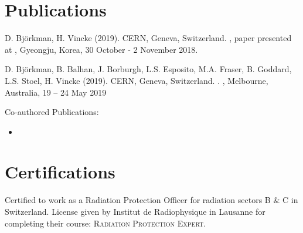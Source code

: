 \documentclass[a4paper,10pt]{article}
\newcommand{\MYhref}[3][blue]{\href{#2}{\color{#1}{#3}}}%
\begin{document}
 
 
 
 
 
 
\section{Publications}
{\small 
\begin{enumerate}[label={[\arabic*]}]
  \item D. Björkman, H. Vincke (2019). CERN, Geneva, Switzerland. \MYhref{https://www.oecd-nea.org/science/wprs/egsaatif/}{"High Energy Internal Beam Dump System for the Super Proton Synchrotron"}, paper presented at , Gyeongju, Korea, 30 October - 2 November 2018.
 
  \item D. Björkman, B. Balhan, J. Borburgh, L.S. Esposito, M.A. Fraser, B. Goddard, L.S. Stoel, H. Vincke (2019).   CERN, Geneva, Switzerland. \MYhref{http://accelconf.web.cern.ch/AccelConf/ipac2019/papers/wepmp024.pdf}{"Alternative Material Choices to Reduce Activation of Extraction Equipment"}. , Melbourne, Australia, 19 – 24 May 2019
\end{enumerate}
\hspace{7.5mm} Co-authored Publications: \
\begin{itemize}
\setlength{\itemindent}{4mm}
\item \MYhref{https://ipac2019.vrws.de/papers/wepmp031.pdf}{"SPS Slow Extraction Losses and Activation: Update on Recent Improvements"}
\end{itemize}

 
\section{Certifications}
Certified to work as a Radiation Protection Officer for radiation sectors B $\&$ C in Switzerland. License given by Institut de Radiophysique in Lausanne for completing their course: \textsc{Radiation Protection Expert}.
 
 
}
\end{document}
